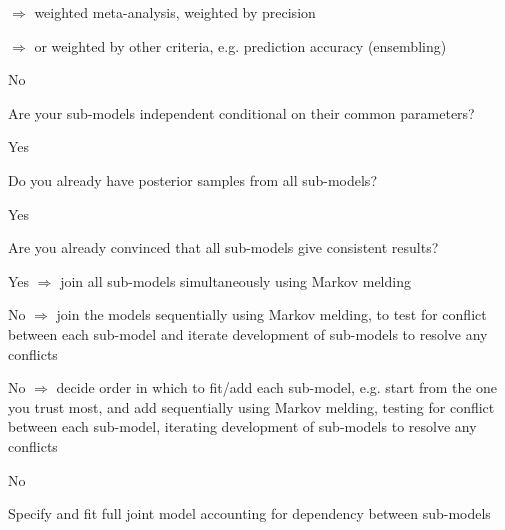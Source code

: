 \documentclass{article}
\begin{document}
\begin{tree}
\begin{tree}
\begin{tree}
\begin{tree}
\begin{tree}
\begin{tree}
                        \begin{tree}
                            \item $\Rightarrow$ weighted meta-analysis, weighted by precision
                            \item $\Rightarrow$ or weighted by other criteria, e.g. prediction accuracy (ensembling)
                        \end{tree}
                    \end{tree}
                \end{tree}
            \end{tree}
        \end{tree}
        \item No
        \begin{tree}
        \item Are your sub-models independent conditional on their common parameters?
        \begin{tree}
            \item Yes
            \begin{tree}
                \item Do you already have posterior samples from all sub-models?
                \begin{tree}
                    \item Yes
                    \begin{tree}
                        \item Are you already convinced that all sub-models give consistent results?
                        \begin{tree}
                            \item Yes $\Rightarrow$ join all sub-models simultaneously using Markov melding
                            \item No $\Rightarrow$ join the models sequentially using Markov melding, to test for conflict between each sub-model and iterate development of sub-models to resolve any conflicts
                        \end{tree}
                    \end{tree}
                    \item No $\Rightarrow$ decide order in which to fit/add each sub-model, e.g. start from the one you trust most, and add sequentially using Markov melding, testing for conflict between each sub-model, iterating development of sub-models to resolve any conflicts
                \end{tree}
            \end{tree}
            \item No
            \begin{tree}
                \item Specify and fit full joint model accounting for dependency between sub-models
            \end{tree}
        \end{tree}
        \end{tree}
    \end{tree}
\end{tree}
\end{document}
